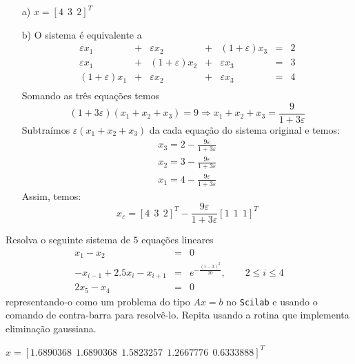 \begin{resp}
  
\begin{itemize}
\item[a)] $x=[4 ~~3 ~~2]^T$

\item[b)] O sistema é equivalente a
$$
\begin{array}{lclclcl}
\varepsilon x_1 &+& \varepsilon x_2 &+&(1+\varepsilon) x_3 &=& 2\\
\varepsilon x_1 &+& (1+\varepsilon) x_2 &+&\varepsilon x_3 &=& 3\\
(1+\varepsilon) x_1 &+& \varepsilon x_2 &+&\varepsilon x_3 &=& 4\\
\end{array}
$$
Somando as três equações temos
$$(1+3\varepsilon)(x_1+x_2+x_3)=9\Longrightarrow x_1+x_2+x_3=\frac{9}{1+3\varepsilon}$$
Subtraímos $\varepsilon(x_1+x_2+x_3)$ da cada equação do sistema original e temos:
$$\begin{array}{l}
x_3=2-\frac{9\varepsilon}{1+3\varepsilon}\\
x_2=3-\frac{9\varepsilon}{1+3\varepsilon}\\
x_1=4-\frac{9\varepsilon}{1+3\varepsilon}
\end{array}
$$
Assim, temos:
$$x_{\varepsilon}=\left[4 ~~3 ~~2\right]^T-\frac{9\varepsilon}{1+3\varepsilon}\left[1 ~~1 ~~1\right]^T$$
\end{itemize}
      
\end{resp}
\fi

\ifisscilab
\begin{exer}\label{trid} Resolva o seguinte sistema de $5$ equações lineares
\begin{eqnarray*}
x_1-x_2&=&0\\
-x_{i-1}+2.5x_i-x_{i+1}&=&e^{-\frac{(i-3)^2}{20}},\qquad 2\leq i \leq 4\\
2x_{5}-x_{4}&=&0
\end{eqnarray*}
representando-o como um problema do tipo $Ax=b$ no \verb+Scilab+ e usando o comando de contra-barra para resolvê-lo. Repita usando a rotina que implementa eliminação gaussiana.
\end{exer}
\begin{resp}
  
 $x=[ 1.6890368  ~~  1.6890368  ~~  1.5823257  ~~  1.2667776   ~~ 0.6333888]^{T}$    
  
\end{resp}
\fi

